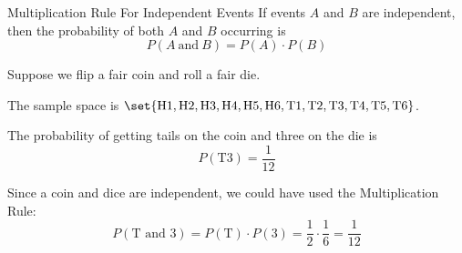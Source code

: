 \documentclass{beamer}
\newcommand{\prob}[1]{P\left(#1\right)}
\begin{document}
\begin{frame}
\begin{block}{Multiplication Rule For Independent Events}
If events $A$ and $B$ are independent, then the probability of both $A$ and $B$ occurring is
\begin{equation*}
\prob{A~\text{and}~B}=\prob{A} \cdot \prob{B}
\end{equation*}
\end{block}\pause

\begin{example}
Suppose we flip a fair coin and roll a fair die. 

\vspace{2mm}
The sample space is $\set{\text{H1}, \text{H2}, \text{H3}, \text{H4}, \text{H5}, \text{H6}, \text{T1}, \text{T2}, \text{T3}, \text{T4}, \text{T5}, \text{T6}}$.\pause

\vspace{2mm}
The probability of getting tails on the coin and three on the die is 
\begin{equation*}
\prob{\text{T3}}=\dfrac{1}{12}
\end{equation*}\pause

\vspace{-3mm}
Since a coin and dice are independent, we could have used the Multiplication Rule:
\begin{equation*}
\prob{\text{T and 3}} = \prob{\text{T}}\cdot\prob{3} = \dfrac{1}{2}\cdot\dfrac{1}{6} = \dfrac{1}{12}
\end{equation*}
\end{example}
\end{frame}
\end{document}
